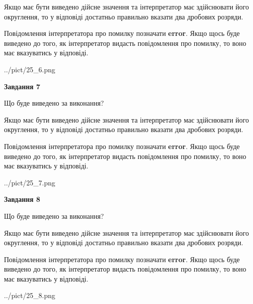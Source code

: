 \documentclass[12pt, ukrainian]{article}
\begin{document}
{\begin {Large}
Якщо має бути виведено дійсне значення та інтерпретатор має здійснювати його округлення, 
то у відповіді достатньо правильно вказати два дробових розряди.

Повідомлення інтерпретатора про помилку позначати \textbf{error}.
Якщо щось буде виведено до того, як інтерпретатор видасть повідомлення про помилку, 
то воно має вказуватись у відповіді. \par

\begin{center}
	{../pict/25_6.png}
\end{center}
\newpage

{\begin {center}\textbf{Завдання 7}\end {center}}\par
Що буде виведено за виконання? \par

Якщо має бути виведено дійсне значення та інтерпретатор має здійснювати його округлення, 
то у відповіді достатньо правильно вказати два дробових розряди.

Повідомлення інтерпретатора про помилку позначати \textbf{error}.
Якщо щось буде виведено до того, як інтерпретатор видасть повідомлення про помилку, 
то воно має вказуватись у відповіді. \par

\begin{center}
	{../pict/25_7.png}
\end{center}
\newpage

{\begin {center}\textbf{Завдання 8}\end {center}}\par
Що буде виведено за виконання? \par

Якщо має бути виведено дійсне значення та інтерпретатор має здійснювати його округлення, 
то у відповіді достатньо правильно вказати два дробових розряди.

Повідомлення інтерпретатора про помилку позначати \textbf{error}.
Якщо щось буде виведено до того, як інтерпретатор видасть повідомлення про помилку, 
то воно має вказуватись у відповіді. \par

\begin{center}
	{../pict/25_8.png}
\end{center}
\newpage


\end{Large}}
\end{document}

